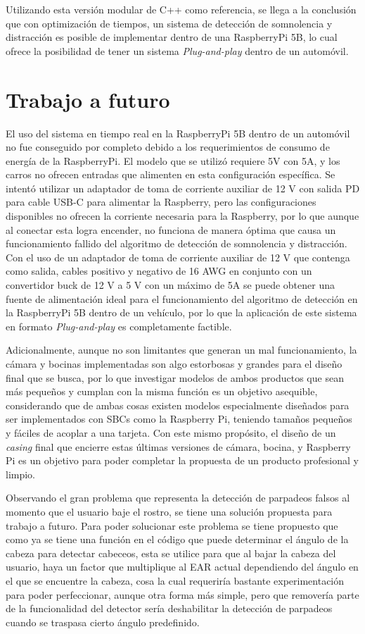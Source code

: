 Utilizando esta versión modular de C++ como referencia, se llega a la conclusión que con optimización de tiempos, un sistema de detección de somnolencia y distracción es posible de implementar dentro de una RaspberryPi 5B, lo cual ofrece la posibilidad de tener un sistema \textit{Plug-and-play} dentro de un automóvil.
\section{Trabajo a futuro}
El uso del sistema en tiempo real en la RaspberryPi 5B dentro de un automóvil no fue conseguido por completo debido a los requerimientos de consumo de energía de la RaspberryPi. El modelo que se utilizó requiere 5V con 5A, y los carros no ofrecen entradas que alimenten en esta configuración específica. Se intentó utilizar un adaptador de toma de corriente auxiliar de 12 V con salida PD para cable USB-C para alimentar la Raspberry, pero las configuraciones disponibles no ofrecen la corriente necesaria para la Raspberry, por lo que aunque al conectar esta logra encender, no funciona de manera óptima que causa un funcionamiento fallido del algoritmo de detección de somnolencia y distracción. Con el uso de un adaptador de toma de corriente auxiliar de 12 V que contenga como salida, cables positivo y negativo de 16 AWG en conjunto con un convertidor buck de 12 V a 5 V con un máximo de 5A se puede obtener una fuente de alimentación ideal para el funcionamiento del algoritmo de detección en la RaspberryPi 5B dentro de un vehículo, por lo que la aplicación de este sistema en formato \textit{Plug-and-play} es completamente factible.

Adicionalmente, aunque no son limitantes que generan un mal funcionamiento, la cámara y bocinas implementadas son algo estorbosas y grandes para el diseño final que se busca, por lo que investigar modelos de ambos productos que sean más pequeños y cumplan con la misma función es un objetivo asequible, considerando que de ambas cosas existen modelos especialmente diseñados para ser implementados con SBCs como la Raspberry Pi, teniendo tamaños pequeños y fáciles de acoplar a una tarjeta. Con este mismo propósito, el diseño de un \textit{casing} final que encierre estas últimas versiones de cámara, bocina, y Raspberry Pi es un objetivo para poder completar la propuesta de un producto profesional y limpio.

Observando el gran problema que representa la detección de parpadeos falsos al momento que el usuario baje el rostro, se tiene una solución propuesta para trabajo a futuro. Para poder solucionar este problema se tiene propuesto que como ya se tiene una función en el código que puede determinar el ángulo de la cabeza para detectar cabeceos, esta se utilice para que al bajar la cabeza del usuario, haya un factor que multiplique al EAR actual dependiendo del ángulo en el que se encuentre la cabeza, cosa la cual requeriría bastante experimentación para poder perfeccionar, aunque otra forma más simple, pero que removería parte de la funcionalidad del detector sería deshabilitar la detección de parpadeos cuando se traspasa cierto ángulo predefinido.


